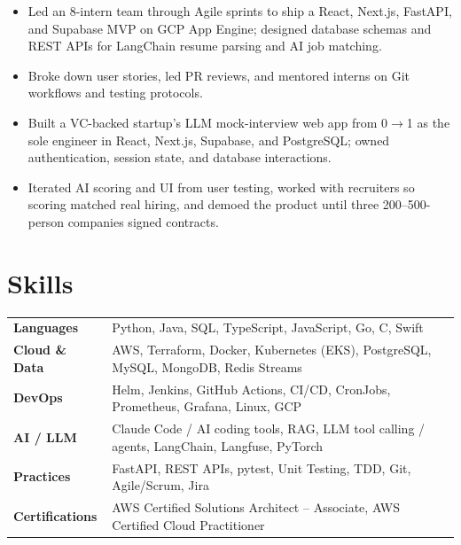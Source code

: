 \documentclass[11pt, letterpaper]{article}
\begin{document}
\vspace{1pt}
\begin{itemize}
  \item Led an 8-intern team through Agile sprints to ship a React, Next.js, FastAPI, and Supabase MVP on GCP App Engine; designed database schemas and REST APIs for LangChain resume parsing and AI job matching.
  \item Broke down user stories, led PR reviews, and mentored interns on Git workflows and testing protocols.
\end{itemize}

\vspace{1pt}
\begin{itemize}
  \item Built a VC-backed startup's LLM mock-interview web app from 0$\to$1 as the sole engineer in React, Next.js, Supabase, and PostgreSQL; owned authentication, session state, and database interactions.
  \item Iterated AI scoring and UI from user testing, worked with recruiters so scoring matched real hiring, and demoed the product until three 200--500-person companies signed contracts.
\end{itemize}

\section{Skills}
\begin{tabularx}{\textwidth}{@{}l @{\hspace{7pt}} >{\raggedright\arraybackslash}X@{}}
  \textbf{Languages} & Python, Java, SQL, TypeScript, JavaScript, Go, C, Swift \\[1pt]
  \textbf{Cloud \& Data} & AWS, Terraform, Docker, Kubernetes (EKS), PostgreSQL, MySQL, MongoDB, Redis Streams \\[1pt]
  \textbf{DevOps} & Helm, Jenkins, GitHub Actions, CI/CD, CronJobs, Prometheus, Grafana, Linux, GCP \\[1pt]
  \textbf{AI / LLM} & Claude Code / AI coding tools, RAG, LLM tool calling / agents, LangChain, Langfuse, PyTorch \\[1pt]
  \textbf{Practices} & FastAPI, REST APIs, pytest, Unit Testing, TDD, Git, Agile/Scrum, Jira \\[1pt]
  \textbf{Certifications} & AWS Certified Solutions Architect -- Associate, AWS Certified Cloud Practitioner \\
\end{tabularx}
\end{document}

